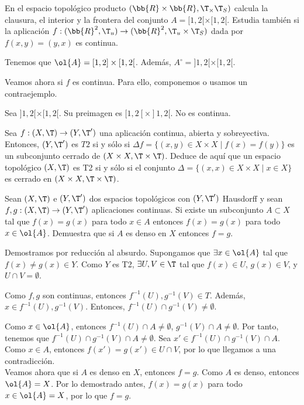 \begin{ejercicio}
    En el espacio topológico producto $(\bb{R} \times \bb{R}, \T_ \times \T_S)$ calcula la clausura, el interior y la frontera del conjunto $A=[1, 2[ \times [1, 2[$. Estudia también si la aplicación $f : (\bb{R}^2, \T_u) \to(\bb{R}^2, \T_u \times \T_S)$ dada por $f(x, y) = (y, x)$ es continua.

    Tenemos que $\ol{A}=[1,2]\times [1,2[$. Además, $A^\circ = ]1,2[\times [1,2[$.

    Veamos ahora si $f$ es continua. Para ello, componemos o usamos un contraejemplo.

    Sea $]1,2[\times [1,2[$. Su preimagen es $[1,2[\times ]1,2[$.
    No es continua.
\end{ejercicio}


\begin{ejercicio}
    Sea $f : (X,\T) \to (Y, \T')$ una aplicación continua, abierta y sobreyectiva. Entonces, $(Y, \T')$ es $T2$ si y sólo si $\Delta f = \{(x, y) \in X \times X \mid f(x) = f(y)\}$ es un subconjunto cerrado de $(X \times X, \T \times \T )$. Deduce de aquí que un espacio topológico $(X,\T)$ es T2 si y sólo si el conjunto $\Delta = \{(x, x) \in X \times X \mid x \in X\}$ es cerrado en $(X \times X, \T \times \T )$.
\end{ejercicio}

\begin{ejercicio}
    Sean $(X,\T)$ e $(Y, \T')$ dos espacios topológicos con $(Y, \T')$ Hausdorff y sean $f, g :(X,\T) \to (Y, \T')$ aplicaciones continuas. Si existe un subconjunto $A \subset X$ tal que $f(x) = g(x)$ para todo $x \in A$ entonces $f(x) = g(x)$ para todo $x \in \ol{A}$. Demuestra que si $A$ es denso en $X$ entonces $f=g$.

    Demostramos por reducción al absurdo. Supongamos que $\exists x\in\ol{A}$ tal que $f(x)\neq g(x)\in Y$. Como $Y$ es T2, $\exists U,V\in \T$ tal que $f(x)\in U$, $g(x)\in V$, y $U\cap V=\emptyset$.

    Como $f,g$ son continuas, entonces $f^{-1}(U), g^{-1}(V)\in T$. Además, $x\in f^{-1}(U), g^{-1}(V)$. Entonces, $f^{-1}(U)\cap g^{-1}(V)\neq \emptyset$.

    Como $x\in \ol{A}$, entonces $f^{-1}(U)\cap A\neq \emptyset$, $g^{-1}(V)\cap A\neq \emptyset$. Por tanto, tenemos que $f^{-1}(U)\cap g^{-1}(V)\cap A \neq \emptyset$. Sea $x'\in f^{-1}(U)\cap g^{-1}(V)\cap A$. Como $x\in A$, entonces $f(x')=g(x')\in U\cap V$, por lo que llegamos a una contradicción.\\

    Veamos ahora que si $A$ es denso en $X$, entonces $f=g$. Como $A$ es denso, entonces $\ol{A}=X$. Por lo demostrado antes, $f(x)=g(x)$ para todo $x\in \ol{A}=X$, por lo que $f=g$.
\end{ejercicio}

